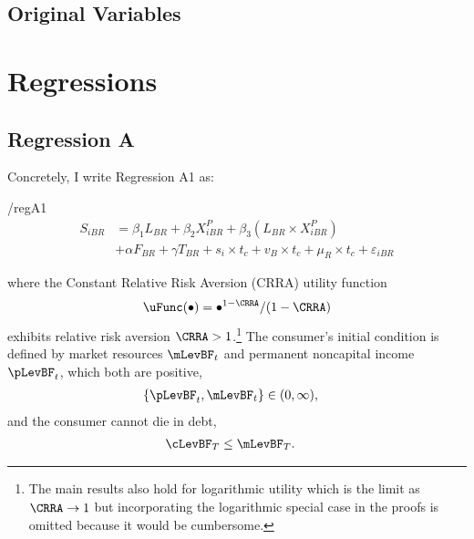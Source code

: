 \documentclass[ProjectKWK]{subfiles}
\begin{document}
\subsection{Original Variables}\label{subsec:OriginalVariables}



\hypertarget{Regressions}{}

\section{Regressions}

\subsection{Regression A}\label{subsec:Regression A}


Concretely, I write Regression A1 as:

\begin{verbatimwrite}{\EqDir/regA1}
  \begin{align*}%
    S_{iBR} &= \beta_{1} L_{BR} + \beta_{2} X_{iBR}^{P} + \beta_{3} (L_{BR} \times X_{iBR}^{P} ) \nonumber \\
    &+ \alpha F_{BR} + \gamma T_{BR}+ s_{i} \times t_{c}+ v_{B} \times t_{c}+\mu_{R} \times t_{c}+\varepsilon_{iBR} \label{eq:regA1}
  \end{align*}
\end{verbatimwrite}


where the Constant Relative Risk Aversion (CRRA) utility function
\begin{align}
  \uFunc(\bullet)=\bullet^{1-\CRRA}/(1-\CRRA) \label{eq:crrautil}
\end{align}
exhibits relative risk aversion $\CRRA > 1$.\footnote{The main
  results also hold for logarithmic utility which is the limit as
  $\CRRA \rightarrow 1$ but incorporating the logarithmic special case
  in the proofs is omitted because it would be cumbersome.}  The consumer's initial condition is
defined by market resources $\mLevBF_{t}$ and permanent noncapital income $\pLevBF_{t}$, which
both are positive,
\begin{align}
  \{\pLevBF_{t},\mLevBF_{t}\} & \in (0,\infty) \label{eq:pLevBFandmLevBFgt0},
\end{align}
and the consumer cannot die in debt,
\begin{align}
  \cLevBF_{T} & \leq  \mLevBF_{T} \label{eq:NoDebtAtDeath}.
\end{align}
\end{document}
